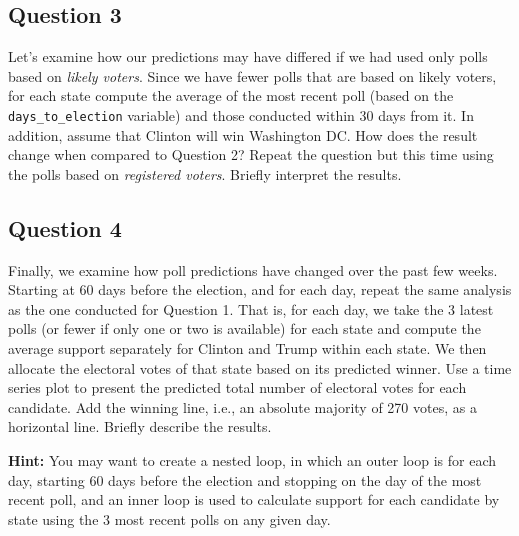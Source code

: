 \documentclass[]{article}
\begin{document}
\subsection{Question 3}\label{question-3}

Let's examine how our predictions may have differed if we had used only
polls based on \emph{likely voters}. Since we have fewer polls that are
based on likely voters, for each state compute the average of the most
recent poll (based on the \texttt{days\_to\_election} variable) and
those conducted within 30 days from it. In addition, assume that Clinton
will win Washington DC. How does the result change when compared to
Question 2? Repeat the question but this time using the polls based on
\emph{registered voters}. Briefly interpret the results.

\subsection{Question 4}\label{question-4}

Finally, we examine how poll predictions have changed over the past few
weeks. Starting at 60 days before the election, and for each day, repeat
the same analysis as the one conducted for Question 1. That is, for each
day, we take the 3 latest polls (or fewer if only one or two is
available) for each state and compute the average support separately for
Clinton and Trump within each state. We then allocate the electoral
votes of that state based on its predicted winner. Use a time series
plot to present the predicted total number of electoral votes for each
candidate. Add the winning line, i.e., an absolute majority of 270
votes, as a horizontal line. Briefly describe the results.

\textbf{Hint:} You may want to create a nested loop, in which an outer
loop is for each day, starting 60 days before the election and stopping
on the day of the most recent poll, and an inner loop is used to
calculate support for each candidate by state using the 3 most recent
polls on any given day.
\end{document}
